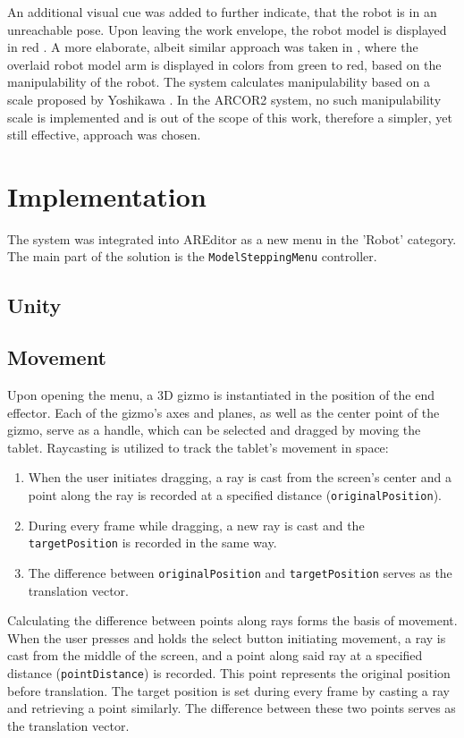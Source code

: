 An additional visual cue was added to further indicate, that the robot is in an unreachable pose. Upon leaving the work envelope, the robot model is displayed in red . A more elaborate, albeit similar approach was taken in \cite{ONG2020101820}, where the overlaid robot model arm is displayed in colors from green to red, based on the manipulability of the robot. The system calculates manipulability based on a scale proposed by Yoshikawa \cite{yoshikawa}. In the ARCOR2 system, no such manipulability scale is implemented and is out of the scope of this work, therefore a simpler, yet still effective, approach was chosen.

\chapter{Implementation}

The system was integrated into AREditor as a new menu in the 'Robot' category. The main part of the solution is the \texttt{ModelSteppingMenu} controller. 

\section{Unity}

\section{Movement}

Upon opening the menu, a 3D gizmo is instantiated in the position of the end effector. Each of the gizmo's axes and planes, as well as the center point of the gizmo, serve as a handle, which can be selected and dragged by moving the tablet. Raycasting is utilized to track the tablet's movement in space:

\begin{enumerate}
    \item When the user initiates dragging, a ray is cast from the screen's center and a point along the ray is recorded at a specified distance (\texttt{originalPosition}).
    \item During every frame while dragging, a new ray is cast and the \texttt{targetPosition} is recorded in the same way.
    \item The difference between \texttt{originalPosition} and \texttt{targetPosition} serves as the translation vector.
\end{enumerate}

Calculating the difference between points along rays forms the basis of movement. When the user presses and holds the select button initiating movement, a ray is cast from the middle of the screen, and a point along said ray at a specified distance (\texttt{pointDistance}) is recorded. This point represents the original position before translation. The target position is set during every frame by casting a ray and retrieving a point similarly. The difference between these two points serves as the translation vector.

